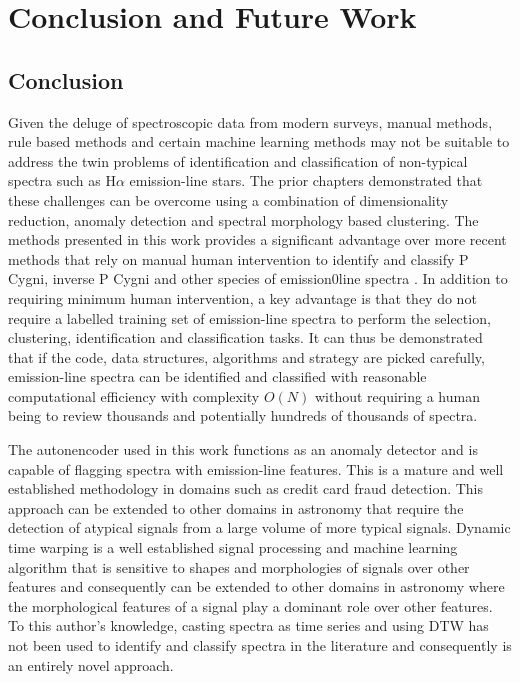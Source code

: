 \chapter{Conclusion and Future Work}

\section{Conclusion}

Given the deluge of spectroscopic data from modern surveys, manual methods, rule based methods and certain machine learning methods may not be suitable to address the twin problems of identification and classification of non-typical spectra such as H$\alpha$ emission-line stars. The prior chapters demonstrated that these challenges can be overcome using a combination of dimensionality reduction, anomaly detection and spectral morphology based clustering. 
The methods presented in this work provides a significant advantage over more recent methods that rely on manual human intervention to identify and classify P Cygni, inverse P Cygni and other species of emission0line spectra \cite{zhang2021catalog} \cite{zhao2012lamost}. In addition to requiring minimum human intervention, a key advantage is that they do not require a labelled training set of emission-line spectra to perform the selection, clustering, identification and classification tasks. It can thus be demonstrated that if the code, data structures, algorithms and strategy are picked carefully, emission-line spectra can be identified and classified with reasonable computational efficiency with complexity $O(N)$ without requiring a human being to review thousands and potentially hundreds of thousands of spectra.

The autonencoder used in this work functions as an anomaly detector and is capable of flagging spectra with emission-line features. This is a mature and well established methodology in domains such as credit card fraud detection. This approach can be extended to other domains in astronomy that require the detection of atypical signals from a large volume of more typical signals. Dynamic time warping is a well established signal processing and machine learning algorithm that is sensitive to shapes and morphologies of signals over other features and consequently can be extended to other domains in astronomy where the morphological features of a signal play a dominant role over other features. To this author's knowledge, casting spectra as time series and using DTW has not been used to identify and classify spectra in the literature and consequently is an entirely novel approach. 

